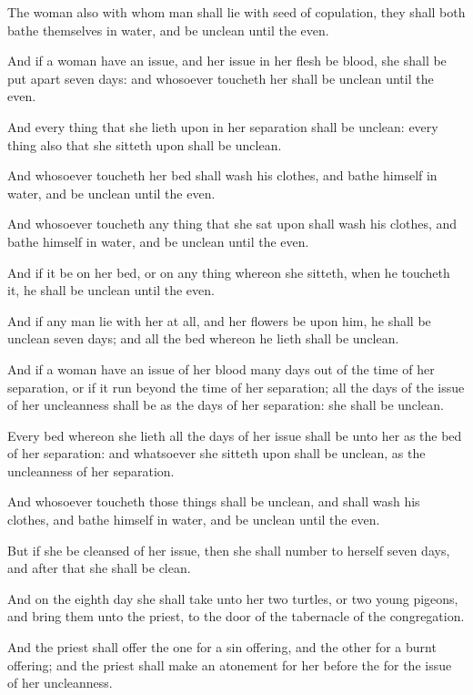 \Verse The woman also with whom man shall lie with seed of copulation, they shall both bathe themselves in water, and be unclean until the even.

\Verse And if a woman have an issue, and her issue in her flesh be blood, she shall be put apart seven days: and whosoever toucheth her shall be unclean until the even.

\Verse And every thing that she lieth upon in her separation shall be unclean: every thing also that she sitteth upon shall be unclean.

\Verse And whosoever toucheth her bed shall wash his clothes, and bathe himself in water, and be unclean until the even.

\Verse And whosoever toucheth any thing that she sat upon shall wash his clothes, and bathe himself in water, and be unclean until the even.

\Verse And if it be on her bed, or on any thing whereon she sitteth, when he toucheth it, he shall be unclean until the even.

\Verse And if any man lie with her at all, and her flowers be upon him, he shall be unclean seven days; and all the bed whereon he lieth shall be unclean.

\Verse And if a woman have an issue of her blood many days out of the time of her separation, or if it run beyond the time of her separation; all the days of the issue of her uncleanness shall be as the days of her separation: she shall be unclean.

\Verse Every bed whereon she lieth all the days of her issue shall be unto her as the bed of her separation: and whatsoever she sitteth upon shall be unclean, as the uncleanness of her separation.

\Verse And whosoever toucheth those things shall be unclean, and shall wash his clothes, and bathe himself in water, and be unclean until the even.

\Verse But if she be cleansed of her issue, then she shall number to herself seven days, and after that she shall be clean.

\Verse And on the eighth day she shall take unto her two turtles, or two young pigeons, and bring them unto the priest, to the door of the tabernacle of the congregation.

\Verse And the priest shall offer the one for a sin offering, and the other for a burnt offering; and the priest shall make an atonement for her before the \LORD for the issue of her uncleanness.

